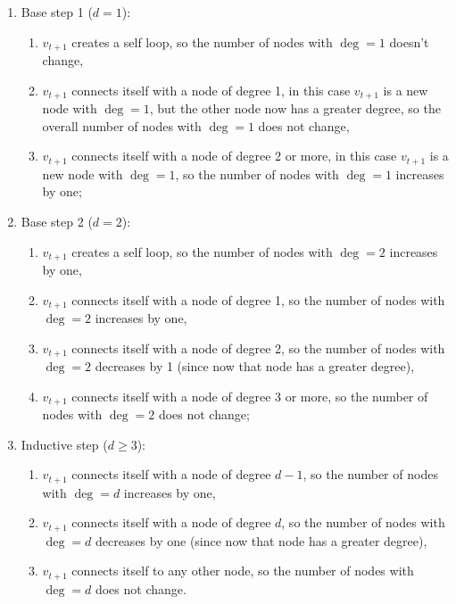 \begin{enumerate}
    \item Base step 1 ($d = 1$):
        \begin{enumerate}
            \item $v_{t+1}$ creates a self loop, so the number of nodes with $\deg=1$ doesn't change,
            \item $v_{t+1}$ connects itself with a node of degree 1, in this case $v_{t+1}$ is a new node with $\deg=1$, but the other node now has a greater degree, so the overall number of nodes with $\deg=1$ does not change,
            \item $v_{t+1}$ connects itself with a node of degree 2 or more, in this case $v_{t+1}$ is a new node with $\deg=1$, so the number of nodes with $\deg=1$ increases by one;
        \end{enumerate}
    \item Base step 2 ($d = 2$):
        \begin{enumerate}
            \item $v_{t+1}$ creates a self loop, so the number of nodes with $\deg=2$ increases by one,
            \item $v_{t+1}$ connects itself with a node of degree 1, so the number of nodes with $\deg=2$ increases by one,
            \item $v_{t+1}$ connects itself with a node of degree 2, so the number of nodes with $\deg=2$ decreases by 1 (since now that node has a greater degree),
            \item $v_{t+1}$ connects itself with a node of degree 3 or more, so the number of nodes with $\deg=2$ does not change;
        \end{enumerate}
    \item Inductive step ($d \geq 3$):
        \begin{enumerate}
            \item $v_{t+1}$ connects itself with a node of degree $d-1$, so the number of nodes with $\deg=d$ increases by one,
            \item $v_{t+1}$ connects itself with a node of degree $d$, so the number of nodes with $\deg=d$ decreases by one (since now that node has a greater degree),
            \item $v_{t+1}$ connects itself to any other node, so the number of nodes with $\deg=d$ does not change.
        \end{enumerate}
\end{enumerate}
    
